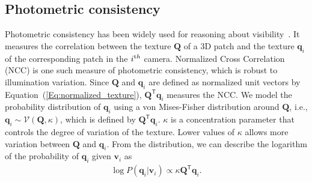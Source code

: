 
%
%

\subsection{Photometric consistency}\label{sub:Photo-Cue}
Photometric consistency has been widely used for reasoning about visibility~\cite{Snavely:2006,Frahm:2010,Furukawa:2010,Furukawa-2008,Devernay2006}. It measures the correlation between the texture $\mathbf{Q}$ of a 3D patch and the texture $\mathbf{q}_i$ of the corresponding patch in the $i^{\textrm th}$ camera. Normalized Cross Correlation (NCC) is one such measure of photometric consistency, which is robust to illumination variation. Since $\mathbf{Q}$ and $\mathbf{q}_i$ are defined as normalized unit vectors by Equation~(\ref{Eq:normalized_texture}), $\mathbf{Q}^\mathsf{T}\mathbf{q}_i$ measures the NCC. We model the probability distribution of $\mathbf{q}_i$ using a von Mises-Fisher distribution around $\mathbf{Q}$, i.e., $\mathbf{q}_i\sim \mathcal{V}(\mathbf{Q}, \kappa)$, which is defined by $\mathbf{Q}^\mathsf{T}\mathbf{q}_i$. $\kappa$ is a concentration parameter that controls the degree of variation of the texture. Lower values of $\kappa$ allows more variation between $\mathbf{Q}$ and $\mathbf{q}_i$. From the distribution, we can describe the logarithm of the probability of $\mathbf{q}_i$ given $\mathbf{v}_i$ as 
\begin{eqnarray}
\log P(\mathbf{q}_i | \mathbf{v}_i) \propto \kappa\mathbf{Q}^\mathsf{T}\mathbf{q}_i.
\label{eq:eq_appearance}
\end{eqnarray}

